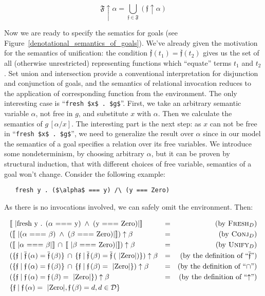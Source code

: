 \[
  \mathfrak{F}\uparrow\alpha = \bigcup_{\mathfrak{f}\in\mathfrak{F}}(\mathfrak{f}\uparrow\alpha)
\]

Now we are ready to specify the sematics for goals (see Figure~\ref{denotational_semantics_of_goals}). We've already given the motivation for
the semantics of unification: the condition $\overline{\mathfrak{f}}(t_1)=\overline{\mathfrak{f}}(t_2)$ gives us the set of all (otherwise
unrestricted) representing functions which ``equate'' terms $t_1$ and $t_2$. Set union and intersection provide a conventional interpretation
for disjunction and conjunction of goals, and the semantics of relational invocation reduces to the application of corresponding
function from the environment. The only interesting case is ``\lstinline|fresh $x$ . $g$|''. First, we take an arbitrary semantic variable $\alpha$,
not free in $g$, and substitute $x$ with $\alpha$. Then we calculate the semantics of $g\,[\alpha/x]$. The interesting part is the next step:
as $x$ can not be free in ``\lstinline|fresh $x$ . $g$|'', we need to generalize the result over $\alpha$ since in our model the semantics of a
goal specifies a relation over its free variables. We introduce some nondeterminism, by choosing arbitrary $\alpha$, but it can be proven by structural induction, that with different choices of free variable, semantics of a goal won't change. Consider the following example:

\begin{lstlisting}
   fresh y . ($\alpha$ === y) /\ (y === Zero)
\end{lstlisting}

As there is no invocations involved, we can safely omit the environment. Then:

\[
\begin{array}{lcr}
  \sembr{\mbox{\lstinline|fresh y . ($\alpha$ === y) $\,\wedge\,$ (y === Zero)|}}&=&\mbox{(by \textsc{Fresh$_D$})}\\[1mm]
  (\sembr{\mbox{\lstinline|($\alpha$ === $\beta$) $\,\wedge\,$ ($\beta$ === Zero)|}})\uparrow\beta&=&\mbox{(by \textsc{Conj$_D$})}\\[1mm]
  (\sembr{\mbox{\lstinline|$\alpha$ === $\beta$|}} \,\cap\, \sembr{\mbox{\lstinline|$\beta$ === Zero)|}})\uparrow\beta&=&\mbox{(by \textsc{Unify$_D$})}\\[1mm]
  (\{\mathfrak{f}\mid \overline{\mathfrak{f}}\,(\alpha)=\overline{\mathfrak{f}}\,(\beta)\} \,\cap\, \{\mathfrak{f}\mid \overline{\mathfrak{f}}\,(\beta)=\overline{\mathfrak{f}}\,(\mbox{\lstinline|Zero|})\})\uparrow\beta&=&\mbox{(by the definition of ``$\overline{\mathfrak{f}}$'')}\\[1mm]
  (\{\mathfrak{f}\mid \mathfrak{f}\,(\alpha)=\mathfrak{f}\,(\beta)\} \,\cap\, \{\mathfrak{f}\mid \mathfrak{f}\,(\beta)=\mbox{\lstinline|Zero|}\})\uparrow\beta&=&\mbox{(by the definition of ``$\cap$'')}\\[1mm]
  (\{\mathfrak{f}\mid \mathfrak{f}\,(\alpha)=\mathfrak{f}\,(\beta)=\mbox{\lstinline|Zero|}\})\uparrow\beta&=&\mbox{(by the definition of ``$\uparrow$'')}\\[1mm]
  \{\mathfrak{f}\mid \mathfrak{f}\,(\alpha)=\mbox{\lstinline|Zero|}, \mathfrak{f}\,(\beta)=d, d\in\mathcal{D}\}&&
\end{array}
\]

